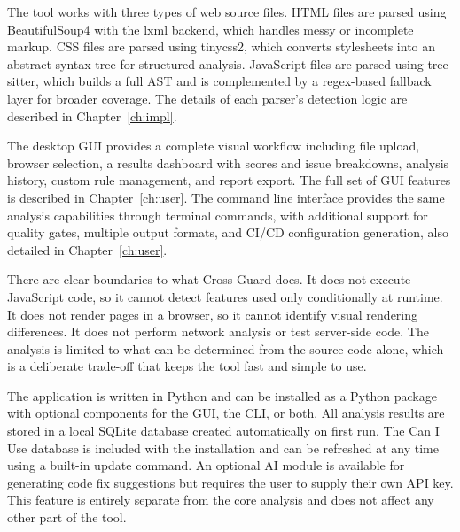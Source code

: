 The tool works with three types of web source files. HTML files are parsed using BeautifulSoup4 with the lxml backend, which handles messy or incomplete markup. CSS files are parsed using tinycss2, which converts stylesheets into an abstract syntax tree for structured analysis. JavaScript files are parsed using tree-sitter, which builds a full AST and is complemented by a regex-based fallback layer for broader coverage. The details of each parser's detection logic are described in Chapter~\ref{ch:impl}.

The desktop GUI provides a complete visual workflow including file upload, browser selection, a results dashboard with scores and issue breakdowns, analysis history, custom rule management, and report export. The full set of GUI features is described in Chapter~\ref{ch:user}. The command line interface provides the same analysis capabilities through terminal commands, with additional support for quality gates, multiple output formats, and CI/CD configuration generation, also detailed in Chapter~\ref{ch:user}.

There are clear boundaries to what Cross Guard does. It does not execute JavaScript code, so it cannot detect features used only conditionally at runtime. It does not render pages in a browser, so it cannot identify visual rendering differences. It does not perform network analysis or test server-side code. The analysis is limited to what can be determined from the source code alone, which is a deliberate trade-off that keeps the tool fast and simple to use.

The application is written in Python and can be installed as a Python package with optional components for the GUI, the CLI, or both. All analysis results are stored in a local SQLite database created automatically on first run. The Can I Use database is included with the installation and can be refreshed at any time using a built-in update command. An optional AI module is available for generating code fix suggestions but requires the user to supply their own API key. This feature is entirely separate from the core analysis and does not affect any other part of the tool.
